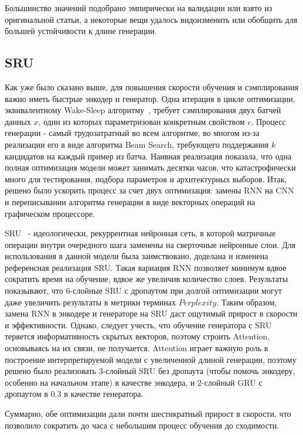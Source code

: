 \documentclass{spbau-diploma}
\begin{document}
Большинство значений подобрано эмпирически на валидации или 
взято из оригинальной статьи, а некоторые вещи удалось видоизменить или 
обобщить для большей устойчивости к длине генерации.

\subsection{SRU}
Как уже было сказано выше, для повышения скорости обучения и сэмплирования 
важно иметь быстрые энкодер и генератор. Одна итерация в цикле оптимизации, 
эквивалентному Wake-Sleep алгоритму~\cite{text_cvae}, требует сэмплирования двух
батчей данных $x$, один из которых параметризован конкретным свойством $c$.
Процесс генерации - самый трудозатратный во всем алгоритме, во многом из-за
реализации его в виде алгоритма Beam Search, требующего поддержания $k$ 
кандидатов на каждый пример из батча. Наивная реализация показала, что 
одна полная оптимизация модели может занимать десятки часов, что 
катастрофически много для тестирования, подбора параметров и архитектурных 
выборов. Итак, решено было ускорить процесс за счет двух оптимизация: замены 
RNN на CNN и переписывании алгоритма генерации в виде векторных операций на 
графическом процессоре.

SRU~\cite{1709.02755} - идеологически, рекуррентная нейронная сеть, в которой 
матричные операции внутри очередного шага заменены на сверточные нейронные 
слои. Для использования в данной модели была заимствовано, доделана и 
изменена референсная реализация SRU. Такая вариация RNN позволяет минимум 
вдвое сократить время на обучение, вдвое же увеличив количество слоев. 
Результаты показывают, что $6$-слойные SRU с дропаутом при долгой оптимизации
могут даже увеличить результаты в метрики терминах $Perplexity$. Таким 
образом, замена RNN в энкодере и генераторе на SRU даст ощутимый прирост в 
скорости и эффективности. Однако, следует учесть, что обучение генератора с 
SRU теряется информативность скрытых векторов, поэтому строить Attention, 
основываясь на их связи, не получается. Attention играет важную роль в 
построение интерпретируемой модели с увеличенной длиной генерации, поэтому 
решено было реализовать $3$-слойный SRU без дропаута (чтобы помочь энкодеру, 
особенно на начальном этапе) в качестве энкодера, и $2$-слойный GRU с 
дропаутом в $0.3$ в качестве генератора.

Суммарно, обе оптимизации дали почти шестикратный прирост в скорости,
что позволило сократить до часа с небольшим процесс обучения до сходимости.
\end{document}
